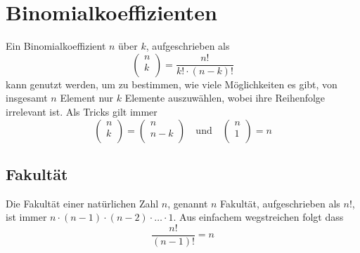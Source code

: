 \documentclass{article}
\begin{document}
 
\newcommand{\bink}[2]{
\begin{pmatrix}
 #1 \\
 #2 \\
\end{pmatrix} 
} 
 
\section{Binomialkoeffizienten} 
 
Ein Binomialkoeffizient $n$ über $k$, aufgeschrieben als
\[ 
\bink{n}{k} 
= \frac{n!}{k! \cdot (n-k)!} 
\]
kann genutzt werden, um zu bestimmen, wie viele Möglichkeiten es gibt, von insgesamt $n$ Element nur $k$ Elemente auszuwählen, wobei ihre Reihenfolge irrelevant ist.
Als Tricks gilt immer
\[
\bink{n}{k} = \bink{n}{n-k}
\quad \text{und} \quad
\bink{n}{1} = n 
\]
 
\subsection{Fakultät}
Die Fakultät einer natürlichen Zahl $n$, genannt $n$ Fakultät, aufgeschrieben als $n!$, ist immer $n \cdot (n-1) \cdot (n-2) \cdot \ldots \cdot 1$. Aus einfachem wegstreichen folgt dass
\[
 \frac{n!}{(n-1)!} = n
\] 
\end{document}
